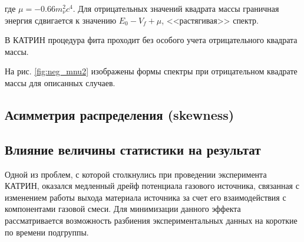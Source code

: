 ﻿\documentclass[a4paper,14pt]{extarticle}
\begin{document}
    \noindent где $\mu = -0.66 m^2_\nu c^4$. Для отрицательных значений квадрата массы граничная
    энергия сдвигается к значению $E_0-V_f+\mu$, <<растягивая>> спектр.
    
    В КАТРИН процедура фита проходит без особого учета отрицательного квадрата массы.
    
    На рис. \ref{fig:neg_mnu2} изображены формы спектры при отрицательном квадрате массы
    для описанных случаев.
    
    
    
\subsection{Асимметрия распределения (skewness)}



  
  \subsection{Влияние величины статистики на результат}
    
    
    Одной из проблем, с которой столкнулись при проведении эксперимента КАТРИН, оказался медленный дрейф
    потенциала газового источника, связанная с изменением работы выхода материала источника за счет
    его взаимодействия с компонентами газовой смеси. Для минимизации данного эффекта рассматривается
    возможность разбиения экспериментальных данных на короткие по времени подгруппы.
    
\end{document}
